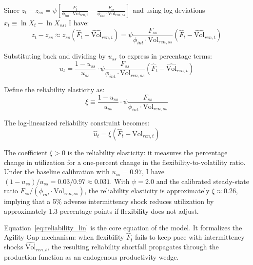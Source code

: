 \documentclass[12pt, a4paper]{article}
\begin{document}
	Since $z_t - z_{ss} = \psi \left[\frac{F_t}{\phi_{int} \cdot \text{Vol}_{ren,t}} - \frac{F_{ss}}{\phi_{int} \cdot \text{Vol}_{ren,ss}}\right]$ and using log-deviations $\hat{x}_t \equiv \ln X_t - \ln X_{ss}$, I have:
	\begin{equation}
		z_t - z_{ss} \approx z_{ss}(\hat{F}_t - \hat{\text{Vol}}_{ren,t}) = \psi \frac{F_{ss}}{\phi_{int} \cdot \text{Vol}_{ren,ss}}(\hat{F}_t - \hat{\text{Vol}}_{ren,t})
	\end{equation}
	
	Substituting back and dividing by $u_{ss}$ to express in percentage terms:
	\begin{equation}
		\hat{u}_t = \frac{1-u_{ss}}{u_{ss}} \cdot \psi \frac{F_{ss}}{\phi_{int} \cdot \text{Vol}_{ren,ss}} (\hat{F}_t - \hat{\text{Vol}}_{ren,t})
	\end{equation}
	
	Define the reliability elasticity as:
	\begin{equation}
		\xi \equiv \frac{1-u_{ss}}{u_{ss}} \cdot \psi \frac{F_{ss}}{\phi_{int} \cdot \text{Vol}_{ren,ss}}
	\end{equation}
	
	The log-linearized reliability constraint becomes:
	\begin{equation}
		\boxed{
			\hat{u}_t = \xi \left(\hat{F}_t - \hat{\text{Vol}}_{ren,t}\right)
		}
		\label{eq:reliability_lin}
	\end{equation}
	
	The coefficient $\xi > 0$ is the reliability elasticity: it measures the percentage change in utilization for a one-percent change in the flexibility-to-volatility ratio. Under the baseline calibration with $u_{ss} = 0.97$, I have $(1-u_{ss})/u_{ss} = 0.03/0.97 \approx 0.031$. With $\psi = 2.0$ and the calibrated steady-state ratio $F_{ss}/(\phi_{int} \cdot \text{Vol}_{ren,ss})$, the reliability elasticity is approximately $\xi \approx 0.26$, implying that a 5\% adverse intermittency shock reduces utilization by approximately 1.3 percentage points if flexibility does not adjust.
	
	Equation~\eqref{eq:reliability_lin} is the core equation of the model. It formalizes the Agility Gap mechanism: when flexibility $\hat{F}_t$ fails to keep pace with intermittency shocks $\hat{\text{Vol}}_{ren,t}$, the resulting reliability shortfall propagates through the production function as an endogenous productivity wedge.
	
\end{document}
